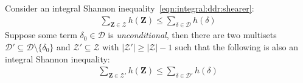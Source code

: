 \documentclass{theoretics}
\newcommand{\calD}{\mathcal D}
\newcommand{\calZ}{\mathcal Z}
\begin{document}
\begin{lemma} \label{lemma:reset} Consider an integral Shannon inequality~\eqref{eqn:integral:ddr:shearer}:
  \begin{align*}
    \sum_{\bm Z \in \calZ}h(\bm Z) \leq \sum_{\delta \in \calD} h(\delta)
  \end{align*}
  Suppose some term $\delta_0 \in \calD$ is {\em unconditional}, then there are two
  multisets $\calD' \subseteq \calD \setminus \{\delta_0\}$ and $\calZ' \subseteq \calZ$
  with $|\calZ'| \geq |\calZ|-1$
  such that the following is also an integral Shannon inequality:
  \begin{align*}
    \sum_{\bm Z \in \calZ'}h(\bm Z) \leq \sum_{\delta \in \calD'} h(\delta)
  \end{align*}
\end{lemma}
\end{document}
